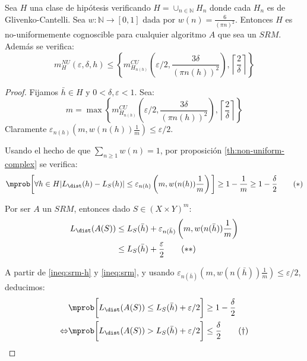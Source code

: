 \begin{theorem}
Sea $H$ una clase de hipótesis verificando $H = \cup_{n\in \mathbb{N}} H_n$ donde cada 
$H_n$ es de Glivenko-Cantelli. Sea $w : \mathbb{N} \rightarrow [0,1]$ dada por $w(n) = \frac{6}{(\pi n)^2}$. 
Entonces $H$ es no-uniformemente cognoscible para cualquier algoritmo $A$ que sea un $SRM$. Además se verifica:
\[
  m_{H}^{NU} (\varepsilon, \delta, h) \le \left\{m_{H_{n(h)}}^{CU} \left(\varepsilon/2, \frac{3 \delta}{(\pi n(h))^2} \right), 
  \left\lceil\frac{2}{\delta}\right\rceil \right\}
\]
\label{th:srm-suficientes}
\end{theorem}
  \begin{proof}
   Fijamos $\bar{h}\in H$ y $0 < \delta, \varepsilon < 1$. Sea:
   \[
     m = \max\left\{m_{H_{n(h)}}^{CU} \left(\varepsilon/2, \frac{3 \delta}{(\pi n(h))^2} \right), \left\lceil\frac{2}{\delta}\right\rceil \right\}
   \]
   Claramente $\varepsilon_{n(h)}\left(m, w(n(h)) \frac{1}{m}\right) \le \varepsilon/2$.

   Usando el hecho de que $\sum_{n\ge 1} w(n) = 1$, por proposición \ref{th:non-uniform-complex} se verifica:    
   \begin{equation}
     \mprob \bigg[\forall h\in H |L_{\dist}(h) - L_S(h)| \le \varepsilon_{n(h)} \left(m, w(n(h)) \frac{1}{m}\right)\bigg] 
     \ge 1-\frac{1}{m} \ge 1 - \frac{\delta}{2}
   \label{ineq:srm-h}\tag{\textrm{$\ast$}}
   \end{equation}
   
   Por ser $A$ un $SRM$, entonces dado $S\in (X\times Y)^m$:
   \begin{align}
     L_{\dist}(A(S)) &\le L_S(\bar{h}) + \varepsilon_{n(\bar{h})} \left(m, w(n(\bar{h}))\frac{1}{m}\right) \nonumber\\
                     &\le L_S(\bar{h}) + \frac{\varepsilon}{2}
     \label{ineq:srm}\tag{\textrm{$\ast$$\ast$}}
   \end{align}
   
   A partir de \eqref{ineq:srm-h} y \eqref{ineq:srm}, y usando $\varepsilon_{n(\bar{h})}\left(m, w(n(\bar{h})) \frac{1}{m}\right) \le \varepsilon/2$, deducimos:
   \begin{align}
                     &\mprob \bigg[L_{\dist}(A(S)) \le L_{S}(\bar{h}) + \varepsilon/2\bigg] \ge 1-\frac{\delta}{2} \nonumber\\
     \Leftrightarrow &\mprob \bigg[L_{\dist}(A(S)) > L_{S}(\bar{h}) + \varepsilon/2\bigg] \le \frac{\delta}{2}
     \label{ineq:LDbound}\tag{\textrm{$\dagger$}}
   \end{align}
   

\end{proof}
